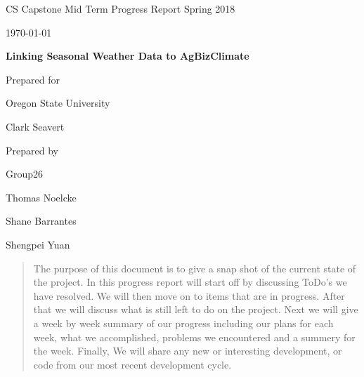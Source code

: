 \documentclass[onecolumn, draftclsnofoot,10pt, compsoc]{article}
\def \CapstoneTeamName{AgBizClimate}
\def \CapstoneTeamNumber{26}
\def \GroupMemberOne{	Thomas Noelcke}
\def \GroupMemberTwo{	Shane Barrantes}
\def \GroupMemberThree{	Shengpei Yuan}
\def \CapstoneProjectName{ Linking Seasonal Weather Data to AgBizClimate\texttrademark}
\def \CapstoneSponsorCompany{ Oregon State University}
\def \CapstoneSponsorPerson{ Clark Seavert}
\def \DocType{		%
				Mid Term Progress Report Spring 2018
				}
\newcommand{\NameSigPair}[1]{\par
\makebox[2.75in][r]{#1} \hfil 	\makebox[3.25in]{\makebox[2.25in]{\hrulefill} \hfill		\makebox[.75in]{\hrulefill}}
\par\vspace{-12pt} \textit{\tiny\noindent
\makebox[2.75in]{} \hfil		\makebox[3.25in]{\makebox[2.25in][r]{Signature} \hfill	\makebox[.75in][r]{Date}}}}
\renewcommand{\NameSigPair}[1]{#1}
\begin{document}
\begin{titlepage}
    \begin{singlespace}
        \hfill
        \par\vspace{.2in}
        \centering
        \scshape{
            \huge CS Capstone \DocType \par
            {\large\today}\par
            \vspace{.5in}
            \textbf{\Huge\CapstoneProjectName}\par
            \vfill
            {\large Prepared for}\par
            \Huge \CapstoneSponsorCompany\par
            \vspace{5pt}
            {\Large\NameSigPair{\CapstoneSponsorPerson}\par}
            {\large Prepared by }\par
            Group\CapstoneTeamNumber\par
            \vspace{5pt}
            {\Large
                \NameSigPair{\GroupMemberOne}\par
                \NameSigPair{\GroupMemberTwo}\par
                \NameSigPair{\GroupMemberThree}\par
            }
            \vspace{20pt}
        }
        \begin{abstract}
					 The purpose of this document is to give a snap shot of the current state of the project. In this progress report will start off by discussing ToDo's we have resolved. We will then move on to items that are in progress. After that we will discuss what is still left to do on the project. Next we will give a week by week summary of our progress including our plans for each week, what we accomplished, problems we encountered and a summery for the week. Finally, We will share any new or interesting development, or code from our most recent development cycle.\\
        \end{abstract}
    \end{singlespace}
\end{titlepage}
\newpage
{}
\tableofcontents
\newpage
\clearpage
\end{document}

